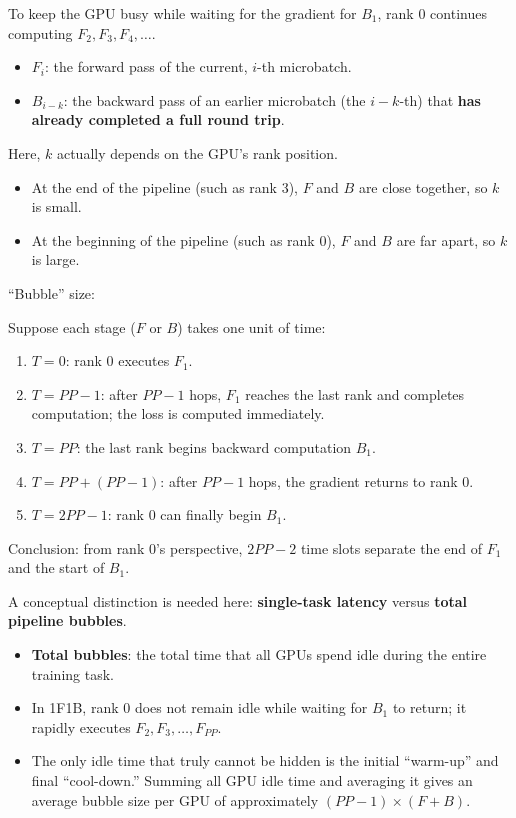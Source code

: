 To keep the GPU busy while waiting for the gradient for \(B_1\), rank 0 continues computing \(F_2, F_3, F_4, \dots\).

\begin{itemize}
\tightlist
\item
  \(F_i\): the forward pass of the current, \(i\)-th microbatch.
\item
  \(B_{i-k}\): the backward pass of an earlier microbatch (the \(i-k\)-th) that \textbf{has already completed a full round trip}.
\end{itemize}

Here, \(k\) actually depends on the GPU's rank position.

\begin{itemize}
\tightlist
\item
  At the end of the pipeline (such as rank 3), \(F\) and \(B\) are close together, so \(k\) is small.
\item
  At the beginning of the pipeline (such as rank 0), \(F\) and \(B\) are far apart, so \(k\) is large.
\end{itemize}

``Bubble'' size:

Suppose each stage (\(F\) or \(B\)) takes one unit of time:

\begin{enumerate}
\def\labelenumi{\arabic{enumi}.}
\tightlist
\item
  \(T = 0\): rank 0 executes \(F_1\).
\item
  \(T = PP - 1\): after \(PP - 1\) hops, \(F_1\) reaches the last rank and completes computation; the loss is computed immediately.
\item
  \(T = PP\): the last rank begins backward computation \(B_1\).
\item
  \(T = PP + (PP - 1)\): after \(PP - 1\) hops, the gradient returns to rank 0.
\item
  \(T = 2PP - 1\): rank 0 can finally begin \(B_1\).
\end{enumerate}

Conclusion: from rank 0's perspective, \(2PP - 2\) time slots separate the end of \(F_1\) and the start of \(B_1\).

A conceptual distinction is needed here: \textbf{single-task latency} versus \textbf{total pipeline bubbles}.

\begin{itemize}
\tightlist
\item
  \textbf{Total bubbles}: the total time that all GPUs spend idle during the entire training task.
\item
  In 1F1B, rank 0 does not remain idle while waiting for \(B_1\) to return; it rapidly executes \(F_2, F_3, \dots, F_{PP}\).
\item
  The only idle time that truly cannot be hidden is the initial ``warm-up'' and final ``cool-down.'' Summing all GPU idle time and averaging it gives an average bubble size per GPU of approximately \((PP - 1) \times (F + B)\).
\end{itemize}

